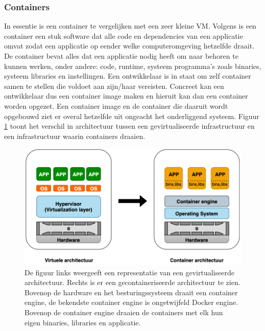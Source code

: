 \subsubsection{Containers}
In essentie is een container te vergelijken met een zeer kleine VM. Volgens \textcite{Docker2019} is een container een stuk software dat alle code en dependencies van een applicatie omvat zodat een applicatie op eender welke computeromgeving hetzelfde draait. De container bevat alles dat een applicatie nodig heeft om naar behoren te kunnen werken, onder andere: code, runtime, systeem programma's zoals binaries, systeem libraries en instellingen. Een ontwikkelaar is in staat om zelf container samen te stellen die voldoet aan zijn/haar vereisten. Concreet kan een ontwikkelaar dus een container image maken en hieruit kan dan een container worden opgezet. Een container image en de container die daaruit wordt opgebouwd ziet er overal hetzelfde uit ongeacht het onderliggend systeem. Figuur \ref{fig:virtualisatie_vs_containers} toont het verschil in architectuur tussen een gevirtualiseerde infrastructuur en een infrastructuur waarin containers draaien.
 \begin{figure}
     \includegraphics[width=1\textwidth]{img/virtualisatie_vs_containers.png}
     \caption{De figuur links weergeeft een representatie van een gevirtualiseerde architectuur. Rechts is er een gecontaineriseerde architectuur te zien. Bovenop de hardware en het besturingssysteem draait een container engine, de bekendste container engine is ongetwijfeld Docker engine. Bovenop de container engine draaien de containers met elk hun eigen binaries, libraries en applicatie.} 
     \label{fig:virtualisatie_vs_containers}  
 \end{figure}


